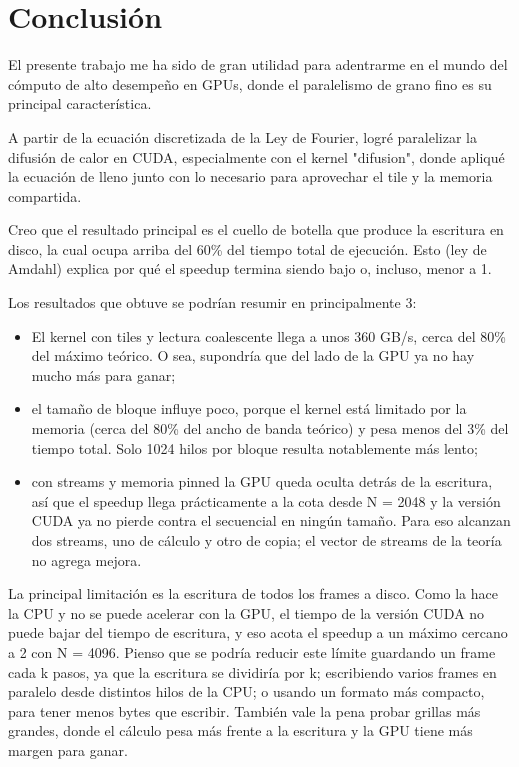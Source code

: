 \section{Conclusión}
El presente trabajo me ha sido de gran utilidad para adentrarme en el mundo del cómputo de alto desempeño en GPUs, donde el paralelismo de grano fino es su principal característica.

A partir de la ecuación discretizada de la Ley de Fourier, logré paralelizar la difusión de calor en CUDA, especialmente con el kernel "difusion", donde apliqué la ecuación de lleno junto con lo necesario para aprovechar el tile y la memoria compartida.

Creo que el resultado principal es el cuello de botella que produce la escritura en disco, la cual ocupa arriba del 60\% del tiempo total de ejecución. Esto (ley de Amdahl) explica por qué el speedup termina siendo bajo o, incluso, menor a 1. 

Los resultados que obtuve se podrían resumir en principalmente 3:
\begin{itemize}
    \item El kernel con tiles y lectura coalescente llega a unos 360 GB/s, cerca del 80\% del máximo teórico. O sea, supondría que del lado de la GPU ya no hay mucho más para ganar;
    \item el tamaño de bloque influye poco, porque el kernel está limitado por la memoria (cerca del 80\% del ancho de banda teórico) y pesa menos del 3\% del tiempo total. Solo 1024 hilos por bloque resulta notablemente más lento;
    \item con streams y memoria pinned la GPU queda oculta detrás de la escritura, así que el speedup llega prácticamente a la cota desde N = 2048 y la versión CUDA ya no pierde contra el secuencial en ningún tamaño. Para eso alcanzan dos streams, uno de cálculo y otro de copia; el vector de streams de la teoría no agrega mejora.
\end{itemize}

La principal limitación es la escritura de todos los frames a disco. Como la hace la CPU y no se puede acelerar con la GPU, el tiempo de la versión CUDA no puede bajar del tiempo de escritura, y eso acota el speedup a un máximo cercano a 2 con N = 4096. Pienso que se podría reducir este límite guardando un frame cada k pasos, ya que la escritura se dividiría por k; escribiendo varios frames en paralelo desde distintos hilos de la CPU; o usando un formato más compacto, para tener menos bytes que escribir. También vale la pena probar grillas más grandes, donde el cálculo pesa más frente a la escritura y la GPU tiene más margen para ganar. 